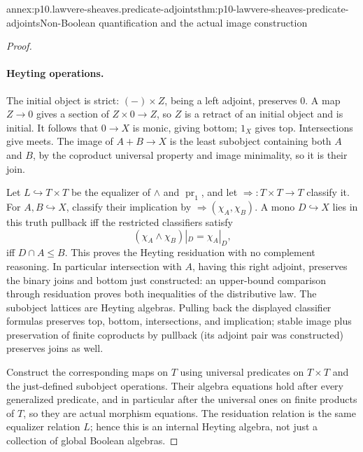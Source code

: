 \begin{annexitem}{annex:p10.lawvere-sheaves.predicate-adjoints}{thm:p10-lawvere-sheaves-predicate-adjoints}{Non-Boolean quantification and the actual image construction}
\begin{proof}
\paragraph{Heyting operations.}
The initial object is strict: \((-)\times Z\), being a left
adjoint, preserves \(0\).  A map \(Z\to0\) gives a
section of \(Z\times0\to Z\), so \(Z\) is a retract
of an initial object and is initial.  It follows that
\(0\to X\) is monic, giving bottom; \(1_X\) gives top.
Intersections give meets.  The image of
\(A+B\to X\) is the least subobject containing both
\(A\) and \(B\), by the coproduct universal property and
image minimality, so it is their join.

Let \(L\hookrightarrow T\times T\) be the equalizer
of \(\land\) and \(\operatorname{pr}_1\), and let
\(\Rightarrow:T\times T\to T\) classify it.  For
\(A,B\hookrightarrow X\), classify their implication
by \(\Rightarrow(\chi_A,\chi_B)\).  A mono
\(D\hookrightarrow X\) lies in this truth pullback iff
the restricted classifiers satisfy
\[
                (\chi_A\land\chi_B)|_D=\chi_A|_D,
\]
iff \(D\cap A\leq B\).  This proves the Heyting
residuation with no complement reasoning.  In particular
intersection with \(A\), having this right adjoint,
preserves the binary joins and bottom just constructed:
an upper-bound comparison through residuation proves
both inequalities of the distributive law.  The subobject
lattices are Heyting algebras.  Pulling back the displayed
classifier formulas preserves top, bottom, intersections,
and implication; stable image plus preservation of finite
coproducts by pullback (its adjoint pair was constructed)
preserves joins as well.

Construct the corresponding maps on \(T\) using universal
predicates on \(T\times T\) and the just-defined subobject
operations.  Their algebra equations hold after every
generalized predicate, and in particular after the universal
ones on finite products of \(T\), so they are actual
morphism equations.  The residuation relation is the same
equalizer relation \(L\); hence this is an internal
Heyting algebra, not just a collection of global Boolean
algebras.


\end{proof}
\end{annexitem}
